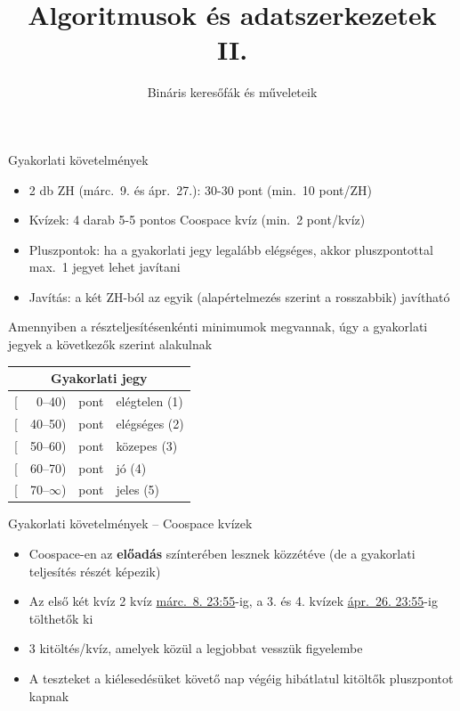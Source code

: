\documentclass{beamer}
\institute{Szegedi Tudományegyetem}
\title{Algoritmusok és adatszerkezetek II.}
\subtitle{Bináris keresőfák és műveleteik}
\date{}
\begin{document}
\maketitle

\begin{frame}{Gyakorlati követelmények}
	\begin{itemize}
		\item 2 db ZH (márc.~9. és ápr.~27.): 30-30 pont (min.~10 pont/ZH)
		\item Kvízek: 4 darab 5-5 pontos Coospace kvíz (min.~2 pont/kvíz)
		\item Pluszpontok: ha a gyakorlati jegy legalább elégséges, akkor 
		pluszpontottal max.~1 jegyet lehet javítani
		\item Javítás: a két ZH-ból az egyik (alapértelmezés szerint a 
		rosszabbik) javítható
	\end{itemize}
	\pause
	Amennyiben a részteljesítésenkénti minimumok megvannak, úgy a gyakorlati 
	jegyek a következők szerint alakulnak
	\begin{table}
	\centering
	\begin{tabular}{r@{}r@{ }ll}
		\multicolumn{4}{c}{Gyakorlati jegy} \\ \hline
		{[}&0--40)  & pont & elégtelen (1) \\
		{[}&40--50) & pont & elégséges (2) \\
		{[}&50--60) & pont & közepes (3) \\
		{[}&60--70) & pont & jó (4) \\
		{[}&70--$\infty$) & pont & jeles (5)
	\end{tabular}
    \end{table}
\end{frame}

\begin{frame}{Gyakorlati követelmények -- Coospace kvízek}
	\begin{itemize}
		\item Coospace-en az \textbf{előadás} színterében lesznek közzétéve (de 
		a gyakorlati teljesítés részét képezik)
		\item Az első két kvíz 2 kvíz 
		\href{https://tinyurl.com/ts359zz}{márc.~8. 23:55}-ig, a 3. 
		és 4. kvízek \href{https://tinyurl.com/rkxjuth}{ápr.~26. 23:55}-ig 
		tölthetők ki
		\item 3 kitöltés/kvíz, amelyek közül a legjobbat vesszük figyelembe
		\pause
		\item A teszteket a kiélesedésüket követő nap végéig hibátlatul 
		kitöltők pluszpontot kapnak
	\end{itemize}
\end{frame}
\end{document}
